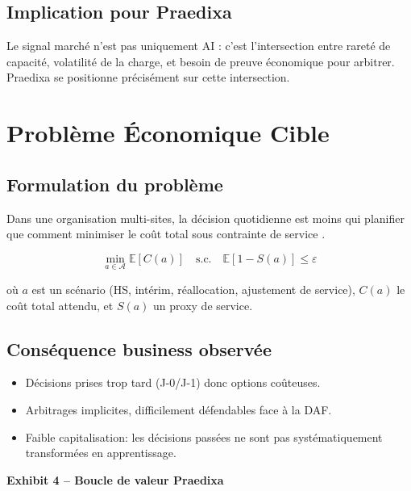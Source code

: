 \documentclass[11pt,a4paper]{article}
\newcommand{\exhibit}[1]{\vspace{2mm}\noindent\colorbox{PraedixaLight}{\parbox{\dimexpr\linewidth-2\fboxsep\relax}{\textbf{#1}}}\vspace{1mm}}
\begin{document}
\subsection{Implication pour Praedixa}
Le signal marché n'est pas uniquement \og AI \fg{}: c'est l'intersection entre rareté de capacité, volatilité de la charge, et besoin de preuve économique pour arbitrer. Praedixa se positionne précisément sur cette intersection.

\section{Problème Économique Cible}
\subsection{Formulation du problème}
Dans une organisation multi-sites, la décision quotidienne est moins \og qui planifier \fg{} que \og comment minimiser le coût total sous contrainte de service \fg{}.

\[
\min_{a \in \mathcal{A}} \mathbb{E}[C(a)] \quad \text{s.c.} \quad \mathbb{E}[1-S(a)] \leq \varepsilon
\]

où $a$ est un scénario (HS, intérim, réallocation, ajustement de service), $C(a)$ le coût total attendu, et $S(a)$ un proxy de service.

\subsection{Conséquence business observée}
\begin{itemize}
  \item Décisions prises trop tard (J-0/J-1) donc options coûteuses.
  \item Arbitrages implicites, difficilement défendables face à la DAF.
  \item Faible capitalisation: les décisions passées ne sont pas systématiquement transformées en apprentissage.
\end{itemize}

\exhibit{Exhibit 4 -- Boucle de valeur Praedixa}
\begin{center}
\end{center}
\end{document}
